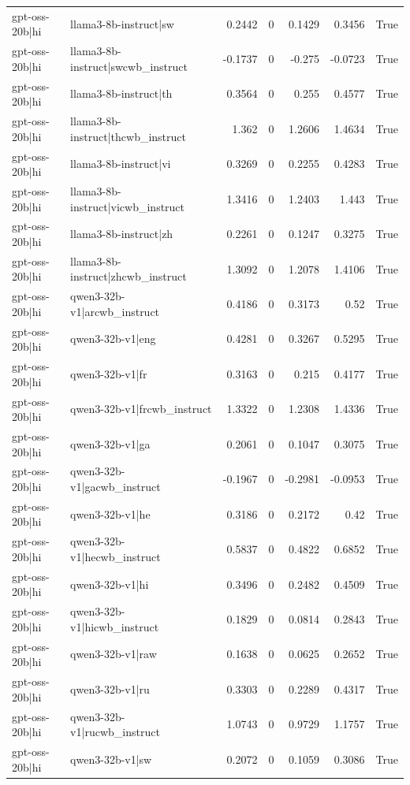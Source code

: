 \begin{table}
\begin{tabular}{l l r r r r l}
gpt-oss-20b|hi & llama3-8b-instruct|sw & 0.2442 & 0 & 0.1429 & 0.3456 & True \\
gpt-oss-20b|hi & llama3-8b-instruct|swcwb_instruct & -0.1737 & 0 & -0.275 & -0.0723 & True \\
gpt-oss-20b|hi & llama3-8b-instruct|th & 0.3564 & 0 & 0.255 & 0.4577 & True \\
gpt-oss-20b|hi & llama3-8b-instruct|thcwb_instruct & 1.362 & 0 & 1.2606 & 1.4634 & True \\
gpt-oss-20b|hi & llama3-8b-instruct|vi & 0.3269 & 0 & 0.2255 & 0.4283 & True \\
gpt-oss-20b|hi & llama3-8b-instruct|vicwb_instruct & 1.3416 & 0 & 1.2403 & 1.443 & True \\
gpt-oss-20b|hi & llama3-8b-instruct|zh & 0.2261 & 0 & 0.1247 & 0.3275 & True \\
gpt-oss-20b|hi & llama3-8b-instruct|zhcwb_instruct & 1.3092 & 0 & 1.2078 & 1.4106 & True \\
gpt-oss-20b|hi & qwen3-32b-v1|arcwb_instruct & 0.4186 & 0 & 0.3173 & 0.52 & True \\
gpt-oss-20b|hi & qwen3-32b-v1|eng & 0.4281 & 0 & 0.3267 & 0.5295 & True \\
gpt-oss-20b|hi & qwen3-32b-v1|fr & 0.3163 & 0 & 0.215 & 0.4177 & True \\
gpt-oss-20b|hi & qwen3-32b-v1|frcwb_instruct & 1.3322 & 0 & 1.2308 & 1.4336 & True \\
gpt-oss-20b|hi & qwen3-32b-v1|ga & 0.2061 & 0 & 0.1047 & 0.3075 & True \\
gpt-oss-20b|hi & qwen3-32b-v1|gacwb_instruct & -0.1967 & 0 & -0.2981 & -0.0953 & True \\
gpt-oss-20b|hi & qwen3-32b-v1|he & 0.3186 & 0 & 0.2172 & 0.42 & True \\
gpt-oss-20b|hi & qwen3-32b-v1|hecwb_instruct & 0.5837 & 0 & 0.4822 & 0.6852 & True \\
gpt-oss-20b|hi & qwen3-32b-v1|hi & 0.3496 & 0 & 0.2482 & 0.4509 & True \\
gpt-oss-20b|hi & qwen3-32b-v1|hicwb_instruct & 0.1829 & 0 & 0.0814 & 0.2843 & True \\
gpt-oss-20b|hi & qwen3-32b-v1|raw & 0.1638 & 0 & 0.0625 & 0.2652 & True \\
gpt-oss-20b|hi & qwen3-32b-v1|ru & 0.3303 & 0 & 0.2289 & 0.4317 & True \\
gpt-oss-20b|hi & qwen3-32b-v1|rucwb_instruct & 1.0743 & 0 & 0.9729 & 1.1757 & True \\
gpt-oss-20b|hi & qwen3-32b-v1|sw & 0.2072 & 0 & 0.1059 & 0.3086 & True \\

\end{tabular}
\end{table}
